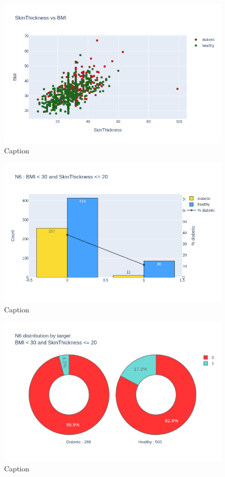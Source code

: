 \documentclass[12pt]{article}
\begin{document}
\begin{figure}[ht]
\centering
\includegraphics[width=1\textwidth]{newplot(25).png}
\caption{\label{fig:35} Caption}
\end{figure}

\begin{figure}[ht]
\centering
\includegraphics[width=1\textwidth]{newplot(26).png}
\caption{\label{fig:36} Caption}
\end{figure}

\begin{figure}[ht]
\centering
\includegraphics[width=1\textwidth]{newplot(27).png}
\caption{\label{fig:37} Caption}
\end{figure}
\end{document}
